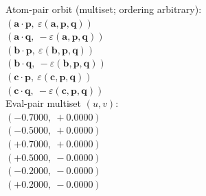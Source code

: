\documentclass[a4paper,11pt]{article}
\newcommand{\pdcegfomjfhook}[2]{\mathbf{#1} \cdot \mathbf{#2}}
\newcommand{\kblbmcpggoncpf}[3]{\varepsilon(\mathbf{#1},\mathbf{#2},\mathbf{#3})}
\begin{document}
\quad Atom-pair orbit (multiset; ordering arbitrary):\\
$(\pdcegfomjfhook{a}{p},\ \kblbmcpggoncpf{a}{p}{q})$\\
$(\pdcegfomjfhook{a}{q},\ -\kblbmcpggoncpf{a}{p}{q})$\\
$(\pdcegfomjfhook{b}{p},\ \kblbmcpggoncpf{b}{p}{q})$\\
$(\pdcegfomjfhook{b}{q},\ -\kblbmcpggoncpf{b}{p}{q})$\\
$(\pdcegfomjfhook{c}{p},\ \kblbmcpggoncpf{c}{p}{q})$\\
$(\pdcegfomjfhook{c}{q},\ -\kblbmcpggoncpf{c}{p}{q})$\\
\quad Eval-pair multiset $(u, v)$:\\
$(-0.7000,\ +0.0000)$\\
$(-0.5000,\ +0.0000)$\\
$(+0.7000,\ +0.0000)$\\
$(+0.5000,\ -0.0000)$\\
$(-0.2000,\ -0.0000)$\\
$(+0.2000,\ -0.0000)$\\
\end{document}
